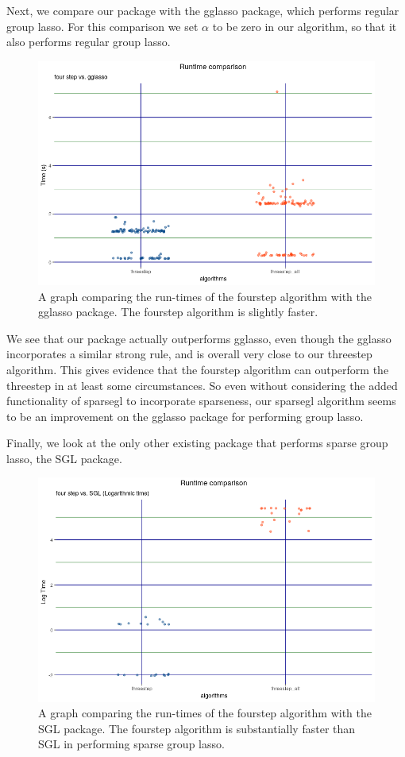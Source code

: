 \documentclass[12pt]{article}
\begin{document}
Next, we compare our package with the gglasso package, which performs regular group lasso. For this comparison we set $\alpha$ to be zero in our algorithm, so that it also performs regular group lasso. 

\begin{figure}[tb!]
\centering
\includegraphics[scale=0.5]{fourgglasso2.png}
\caption{A graph comparing the run-times of the fourstep algorithm with the gglasso package. The fourstep algorithm is slightly faster.}
\label{fig:1fourvsgglasso}
\end{figure}

We see that our package actually outperforms gglasso, even though the gglasso incorporates a similar strong rule, and is overall very close to our threestep algorithm. This gives evidence that the fourstep algorithm can outperform the threestep in at least some circumstances. So even without considering the added functionality of sparsegl to incorporate sparseness, our sparsegl algorithm seems to be an improvement on the gglasso package for performing group lasso.

Finally, we look at the only other existing package that performs sparse group lasso, the SGL package.


\begin{figure}[tb!]
\centering
\includegraphics[scale=0.5]{fourSGL2.png}
\caption{A graph comparing the run-times of the fourstep algorithm with the SGL package. The fourstep algorithm is substantially faster than SGL in performing sparse group lasso.}
\label{fig:fourvsSGL}
\end{figure}
\end{document}
